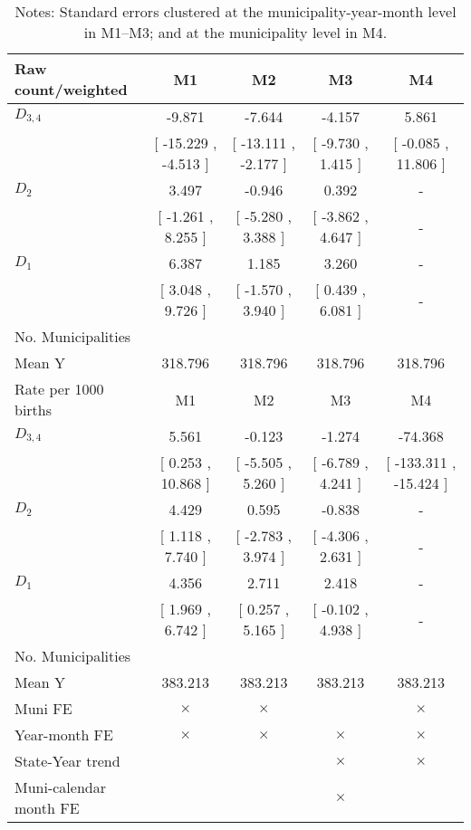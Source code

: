 \begin{table}[!ht]
\centering
\caption{Effects of Drought on csection}\label{tab:twfe_csection}
\fontsize{10pt}{12pt}\selectfont
\begin{tabular}{lcccc}
\toprule
  Raw count/weighted &\multicolumn{1}{c}{M1}&\multicolumn{1}{c}{M2}&\multicolumn{1}{c}{M3}&\multicolumn{1}{c}{M4} \\
\midrule
 $ D_{3,4} $ &    -9.871 &    -7.644 &    -4.157 &     5.861 \\ 
 & [   -15.229 ,    -4.513 ] & [   -13.111 ,    -2.177 ] & [    -9.730 ,     1.415 ] & [    -0.085 ,    11.806 ] \\ 
\addlinespace
 $ D_2 $ &     3.497 &    -0.946 &     0.392 & - \\ 
 & [    -1.261 ,     8.255 ] & [    -5.280 ,     3.388 ] & [    -3.862 ,     4.647 ] & - \\ 
\addlinespace
 $ D_1 $ &     6.387 &     1.185 &     3.260 & - \\ 
 & [     3.048 ,     9.726 ] & [    -1.570 ,     3.940 ] & [     0.439 ,     6.081 ] & - \\ 
\addlinespace
\midrule
  No. Municipalities &  &  &  &   \\
  Mean Y &   318.796 &   318.796 &   318.796 &   318.796  \\
\addlinespace
\midrule
  Rate per 1000 births &\multicolumn{1}{c}{M1}&\multicolumn{1}{c}{M2}&\multicolumn{1}{c}{M3}&\multicolumn{1}{c}{M4} \\
\midrule
 $ D_{3,4} $ &     5.561 &    -0.123 &    -1.274 &   -74.368 \\ 
 & [     0.253 ,    10.868 ] & [    -5.505 ,     5.260 ] & [    -6.789 ,     4.241 ] & [  -133.311 ,   -15.424 ] \\ 
\addlinespace
 $ D_2 $ &     4.429 &     0.595 &    -0.838 & - \\ 
 & [     1.118 ,     7.740 ] & [    -2.783 ,     3.974 ] & [    -4.306 ,     2.631 ] & - \\ 
\addlinespace
 $ D_1 $ &     4.356 &     2.711 &     2.418 & - \\ 
 & [     1.969 ,     6.742 ] & [     0.257 ,     5.165 ] & [    -0.102 ,     4.938 ] & - \\ 
\midrule
  No. Municipalities &  &  &  &   \\
  Mean Y &   383.213 &   383.213 &   383.213 &   383.213  \\
  Muni FE & $ \times $ & $ \times $ &  & $ \times $  \\
  Year-month FE & $ \times $ & $ \times $ & $ \times $ & $ \times $ \\
  State-Year trend &  &  & $ \times $ & $ \times $ \\
  Muni-calendar month FE &  &  & $ \times $ & \\
\bottomrule
\end{tabular}
\caption*{\footnotesize{Notes: Standard errors clustered at the municipality-year-month level in M1--M3; and at the municipality level in M4.}}
\end{table}
